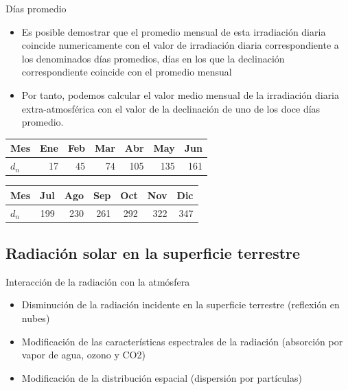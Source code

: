 \documentclass[xcolor={usenames,svgnames,dvipsnames}]{beamer}
\begin{document}
\begin{frame}[label={sec:orga1cdee7}]{Días promedio}
\begin{itemize}
\item Es posible demostrar que el \alert{promedio mensual} de esta irradiación
diaria \alert{coincide numericamente} con el valor de irradiación diaria
correspondiente a los denominados \alert{días promedios}, días en los que
la declinación correspondiente coincide con el promedio mensual

\item Por tanto, podemos calcular el valor medio mensual de la irradiación
diaria extra-atmosférica con el valor de la declinación de uno de los
doce días promedio.
\end{itemize}

\begin{center}
\begin{tabular}{lrrrrrr}
Mes & Ene & Feb & Mar & Abr & May & Jun\\
\hline
\(d_n\) & 17 & 45 & 74 & 105 & 135 & 161\\
\end{tabular}
\end{center}

\begin{center}
\begin{tabular}{lrrrrrr}
Mes & Jul & Ago & Sep & Oct & Nov & Dic\\
\hline
\(d_n\) & 199 & 230 & 261 & 292 & 322 & 347\\
\end{tabular}
\end{center}
\end{frame}

\subsection{Radiación solar en la superficie terrestre}
\label{sec:orgb0ea2cc}

\begin{frame}[label={sec:org5fa1193}]{Interacción de la radiación con la atmósfera}
\begin{itemize}
\item \alert{Disminución} de la radiación incidente en la superficie terrestre
(reflexión en nubes)

\item \alert{Modificación de las características espectrales} de la radiación
(absorción por vapor de agua, ozono y CO2)

\item \alert{Modificación de la distribución espacial} (dispersión por
partículas)
\end{itemize}
\end{frame}
\end{document}
